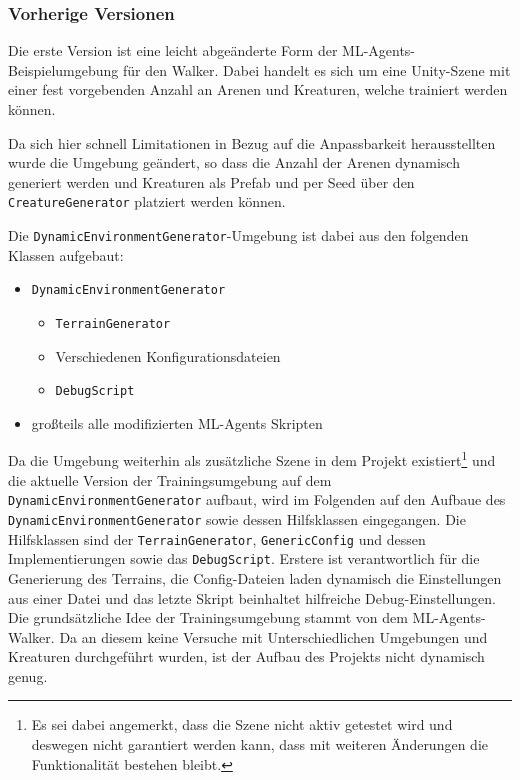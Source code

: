 \subsubsection{Vorherige Versionen}
Die erste Version ist eine leicht abgeänderte Form der ML-Agents-Beispielumgebung für den Walker. Dabei handelt es sich um eine Unity-Szene mit einer fest vorgebenden Anzahl an Arenen und Kreaturen, welche trainiert werden können.

Da sich hier schnell Limitationen in Bezug auf die Anpassbarkeit herausstellten wurde die Umgebung geändert, so dass die Anzahl der Arenen dynamisch generiert werden und Kreaturen als Prefab und per Seed über den \texttt{CreatureGenerator} platziert werden können. 

Die  \texttt{DynamicEnvironmentGenerator}-Umgebung ist dabei aus den folgenden Klassen aufgebaut:

\begin{itemize}
	\item \texttt{DynamicEnvironmentGenerator}
	\begin{itemize}
		\item \texttt{TerrainGenerator} %
		\item Verschiedenen Konfigurationsdateien
		\item \texttt{DebugScript}
	\end{itemize}
	\item großteils alle modifizierten ML-Agents Skripten
\end{itemize} 

Da die Umgebung weiterhin als zusätzliche Szene in dem Projekt existiert\footnote{Es sei dabei angemerkt, dass die Szene nicht aktiv getestet wird und deswegen nicht garantiert werden kann, dass mit weiteren Änderungen die Funktionalität bestehen bleibt.} und die aktuelle Version der Trainingsumgebung auf dem \texttt{DynamicEnvironmentGenerator} aufbaut, wird im Folgenden auf den Aufbaue des \texttt{DynamicEnvironmentGenerator} sowie dessen Hilfsklassen eingegangen. Die Hilfsklassen sind der \texttt{TerrainGenerator}, \texttt{GenericConfig} und dessen Implementierungen sowie das \texttt{DebugScript}. Erstere ist verantwortlich für die Generierung des Terrains, die Config-Dateien laden dynamisch die Einstellungen aus einer Datei und das letzte Skript beinhaltet hilfreiche Debug-Einstellungen. Die grundsätzliche Idee der Trainingsumgebung stammt von dem ML-Agents-Walker. Da an diesem keine Versuche mit Unterschiedlichen Umgebungen und Kreaturen durchgeführt wurden, ist der Aufbau des Projekts nicht dynamisch genug. 

